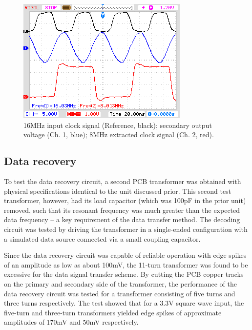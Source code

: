 \documentclass[conference]{IEEEtran}
\begin{document}
	\begin{figure}[t]
		\centering
		\includegraphics[width=0.8\columnwidth]{./img/Clock}
		\caption{16MHz input clock signal (Reference, black); secondary output voltage (Ch. 1, blue); 8MHz extracted clock signal (Ch. 2, red).}
		\label{fig:Clock}
	\end{figure}
	
	\subsection{Data recovery}
	To test the data recovery circuit, a second PCB transformer was obtained with physical specifications identical to the unit discussed prior.  This second test transformer, however, had its load capacitor (which was 100pF in the prior unit) removed, such that its resonant frequency was much greater than the expected data frequency -- a key requirement of the data transfer method.  The decoding circuit was tested by driving the transformer in a single-ended configuration with a simulated data source connected via a small coupling capacitor.
	
	Since the data recovery circuit was capable of reliable operation with edge spikes of an amplitude as low as about 100mV, the 11-turn transformer was found to be excessive for the data signal transfer scheme.  By cutting the PCB copper tracks on the primary and secondary side of the transformer, the performance of the data recovery circuit was tested for a transformer consisting of five turns and three turns respectively.  The test showed that for a 3.3V square wave input, the five-turn and three-turn transformers yielded edge spikes of approximate amplitudes of 170mV and 50mV respectively.
	
\end{document}
